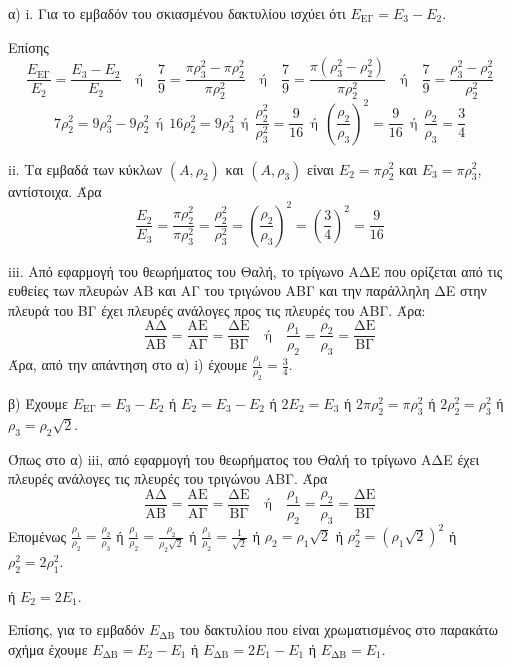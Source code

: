 α) i. Για το εμβαδόν του σκιασμένου δακτυλίου ισχύει ότι $E_{\text{ΕΓ}} = E_3 - E_2$.

Επίσης
\[ \frac{E_{\text{ΕΓ}}}{E_2} = \frac{E_3 - E_2}{E_2} \quad \text{ή} \quad \frac{7}{9} = \frac{\pi\rho_3^2 - \pi\rho_2^2}{\pi\rho_2^2} \quad \text{ή} \quad \frac{7}{9} = \frac{\pi(\rho_3^2 - \rho_2^2)}{\pi\rho_2^2} \quad \text{ή} \quad \frac{7}{9} = \frac{\rho_3^2 - \rho_2^2}{\rho_2^2} \]
\[ 7\rho_2^2 = 9\rho_3^2 - 9\rho_2^2 \ \ \text{ή} \ \ 16\rho_2^2 = 9\rho_3^2 \ \ \text{ή} \ \ \frac{\rho_2^2}{\rho_3^2} = \frac{9}{16} \ \ \text{ή} \ \ \left(\frac{\rho_2}{\rho_3}\right)^2 = \frac{9}{16} \ \ \text{ή} \ \ \frac{\rho_2}{\rho_3} = \frac{3}{4} \]

ii. Τα εμβαδά των κύκλων $(A, \rho_2)$ και $(A, \rho_3)$ είναι $E_2 = \pi\rho_2^2$ και $E_3 = \pi\rho_3^2$, αντίστοιχα.
Άρα
\[ \frac{E_2}{E_3} = \frac{\pi\rho_2^2}{\pi\rho_3^2} = \frac{\rho_2^2}{\rho_3^2} = \left(\frac{\rho_2}{\rho_3}\right)^2 = \left(\frac{3}{4}\right)^2 = \frac{9}{16} \]

iii. Από εφαρμογή του θεωρήματος του Θαλή, το τρίγωνο ΑΔΕ που ορίζεται από τις ευθείες των πλευρών ΑΒ και ΑΓ του τριγώνου ΑΒΓ και την παράλληλη ΔΕ στην πλευρά του ΒΓ έχει πλευρές ανάλογες προς τις πλευρές του ΑΒΓ. Άρα:
\[ \frac{\text{ΑΔ}}{\text{ΑΒ}} = \frac{\text{ΑΕ}}{\text{ΑΓ}} = \frac{\text{ΔΕ}}{\text{ΒΓ}} \quad \text{ή} \quad \frac{\rho_1}{\rho_2} = \frac{\rho_2}{\rho_3} = \frac{\text{ΔΕ}}{\text{ΒΓ}} \]
Άρα, από την απάντηση στο α) i) έχουμε $\frac{\rho_1}{\rho_2} = \frac{3}{4}$.

β) Έχουμε $E_{\text{ΕΓ}} = E_3 - E_2$ ή $E_2 = E_3 - E_2$ ή $2E_2 = E_3$ ή $2\pi\rho_2^2 = \pi\rho_3^2$ ή $2\rho_2^2 = \rho_3^2$ ή $\rho_3 = \rho_2\sqrt{2}$.

Όπως στο α) iii, από εφαρμογή του θεωρήματος του Θαλή το τρίγωνο ΑΔΕ έχει πλευρές ανάλογες τις πλευρές του τριγώνου ΑΒΓ. Άρα
\[ \frac{\text{ΑΔ}}{\text{ΑΒ}} = \frac{\text{ΑΕ}}{\text{ΑΓ}} = \frac{\text{ΔΕ}}{\text{ΒΓ}} \quad \text{ή} \quad \frac{\rho_1}{\rho_2} = \frac{\rho_2}{\rho_3} = \frac{\text{ΔΕ}}{\text{ΒΓ}} \]
Επομένως $\frac{\rho_1}{\rho_2} = \frac{\rho_2}{\rho_3}$ ή $\frac{\rho_1}{\rho_2} = \frac{\rho_2}{\rho_2\sqrt{2}}$ ή $\frac{\rho_1}{\rho_2} = \frac{1}{\sqrt{2}}$ ή $\rho_2 = \rho_1\sqrt{2}$ ή $\rho_2^2 = (\rho_1\sqrt{2})^2$ ή $\rho_2^2 = 2\rho_1^2$.

ή $E_2 = 2E_1$.

Επίσης, για το εμβαδόν $E_{\text{ΔΒ}}$ του δακτυλίου που είναι χρωματισμένος στο παρακάτω σχήμα έχουμε $E_{\text{ΔΒ}} = E_2 - E_1$ ή $E_{\text{ΔΒ}} = 2E_1 - E_1$ ή $E_{\text{ΔΒ}} = E_1$.

